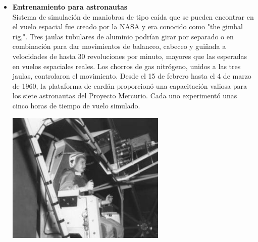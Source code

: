 \begin{itemize}
    \item \textbf{Entrenamiento para astronautas}\\
    Sistema de simulación de maniobras de tipo caída que se pueden encontrar en el vuelo espacial
    fue creado por la NASA y era conocido como "the gimbal rig,".
    Tres jaulas tubulares de aluminio podrían girar por separado o en combinación para 
    dar movimientos de balanceo, cabeceo y guiñada a velocidades de hasta 30 
    revoluciones por minuto, mayores que las esperadas en vuelos espaciales reales. 
    Los chorros de gas nitrógeno, unidos a las tres jaulas, controlaron el movimiento.
    Desde el 15 de febrero hasta el 4 de marzo de 1960, la plataforma de cardán 
    proporcionó una capacitación valiosa para los siete astronautas del Proyecto 
    Mercurio. Cada uno experimentó unas cinco horas de tiempo de vuelo simulado.
    ~\cite{MERCURY}
    \begin{center}
        \includegraphics[width=0.6\textwidth]{Capitulo1/Fig3.eps}       
        \label{Fig3}
    \end{center}


\end{itemize}
